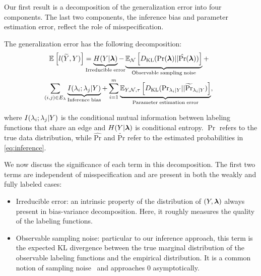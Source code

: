 
Our first result is a decomposition of the generalization error into four components. The last two components, the inference bias and parameter estimation error, reflect the role of misspecification.
\begin{theorem}
The generalization error has the following decomposition:
\begin{align}
    &\E{}{l(\widetilde{Y}, Y)} = \underbrace{H(Y | \bm{\lf})}_{\mathclap{\mathrm{Irreducible \; error}}} - \underbrace{\E{\N}{\KL(\Pr(\bm{\lf}) || \hat{\Pr}(\bm{\lf}))}}_{\mathrm{Observable \; sampling \; noise}} + \nonumber \\ %
    &\sum_{\mathclap{(i, j) \in E_{\lf}}} \;\;\; \underbrace{I(\lf_i; \lf_j | Y)}_{\mathrm{Inference \; bias}} +  \sum_{i = 1}^m \underbrace{\E{Y, \N, \tau}{\KL(\mathrm{Pr}_{\lf_i | Y} || \widetilde{\Pr}_{\lf_i | Y })}}_{\mathrm{Parameter \;estimation \;error}} \nonumber,
\end{align}

where $I(\lambda_i; \lambda_j | Y)$ is the conditional mutual information between labeling functions that share an edge and $H(Y|\bm{\lambda})$ is conditional entropy. $\Pr$ refers to the true data distribution, while $\hat{\mathrm{Pr}}$ and $\widetilde{\mathrm{Pr}}$ refer to the estimated probabilities in \eqref{eq:inference}.

\label{thm:decomposition}
\end{theorem}

We now discuss the significance of each term in this decomposition. The first two terms are independent of misspecification and are present in both the weakly and fully labeled cases:
\begin{itemize}
  \setlength\itemsep{0em}
    \item Irreducible error: an intrinsic property of the distribution of $(Y, \bm{\lambda})$ always present in bias-variance decomposition. Here, it roughly measures the quality of the labeling functions.
    \item %
    Observable sampling noise: particular to our inference approach, this term is the expected KL divergence between the true marginal distribution of the observable labeling functions and the empirical distribution. It is a common notion of sampling noise~\citep{domingos2000unified, yang2020rethinking} and approaches $0$ asymptotically.
\end{itemize}

